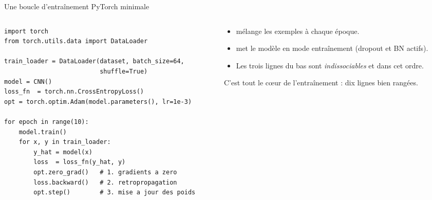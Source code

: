 \begin{frame}[fragile]{Une boucle d'entraînement PyTorch minimale}
\begin{columns}[t]
\begin{column}{0.60\textwidth}
\begin{codebox}
\begin{lstlisting}
import torch
from torch.utils.data import DataLoader

train_loader = DataLoader(dataset, batch_size=64,
                          shuffle=True)
model = CNN()
loss_fn  = torch.nn.CrossEntropyLoss()
opt = torch.optim.Adam(model.parameters(), lr=1e-3)

for epoch in range(10):
    model.train()
    for x, y in train_loader:
        y_hat = model(x)
        loss  = loss_fn(y_hat, y)
        opt.zero_grad()   # 1. gradients a zero
        loss.backward()   # 2. retropropagation
        opt.step()        # 3. mise a jour des poids
\end{lstlisting}
\end{codebox}
\end{column}
\begin{column}{0.38\textwidth}
\begin{itemize}
  \item {} mélange les exemples à chaque époque.
  \item {} met le modèle en mode entraînement (dropout et BN
  actifs).
  \item Les trois lignes du bas sont \emph{indissociables} et dans cet ordre.
\end{itemize}
\begin{kbox}
C'est tout le cœur de l'entraînement : dix lignes bien rangées.
\end{kbox}
\end{column}
\end{columns}
\end{frame}
